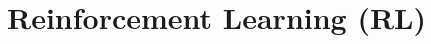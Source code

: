 \documentclass[11pt]{article}
\begin{document}

\section{Reinforcement Learning (RL)}
\end{document}
